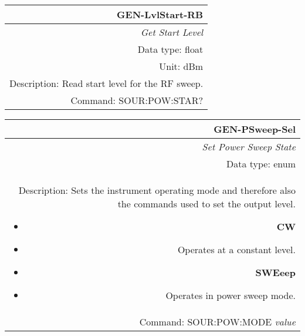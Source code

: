 \documentclass[openany]{article}
\begin{document}
		\begin{tabular}{N}
			\hline
			\bfseries GEN-LvlStart-RB \\ \hline
			\emph{Get Start Level} \\
			Data type: float \\
			Unit: dBm \\
			Description: Read start level for the RF sweep. \\
			Command: SOUR:POW:STAR? \\

		\end{tabular}
%
		\begin{tabular}{N}
			\hline
			\bfseries GEN-PSweep-Sel \\ \hline
			\emph{Set Power Sweep State} \\
			Data type: enum \\
			Description: Sets the instrument operating mode and therefore also the commands used to set the output level. \begin{itemize}[noitemsep]
				\item[] \textbf{CW} 
				\item[] Operates at a constant level.
				\item[] \textbf{SWEeep}
				\item[] Operates in power sweep mode.
			\end{itemize} \\
			Command: SOUR:POW:MODE \emph{value} \\

		\end{tabular}
\end{document}

